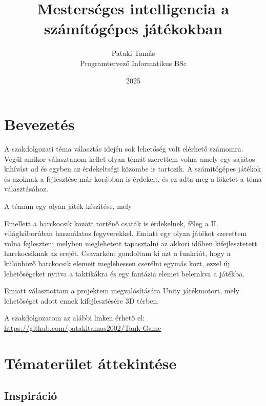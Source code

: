 \documentclass[
]{thesis-ekf}
\theoremstyle{definition}
\theoremstyle{remark}
\begin{document}
\title{Mesterséges intelligencia a számítógépes játékokban}
\author{Pataki Tamás\\Programtervező Informatikus BSc}
\date{2025}
\maketitle

\tableofcontents

\chapter*{Bevezetés}

A szakdolgozati téma választás idején sok lehetőség volt elérhető számomra. Végül amikor választanom kellet olyan témát szerettem volna amely egy sajátos kihívást ad és egyben az érdekeltségi közömbe is tartozik. A számítógépes játékok és azoknak a fejlesztése már korábban is érdekelt, és ez adta meg a löketet a téma választásához.

A témám egy olyan játék készítése, mely

Emellett a harckocsik között történő csaták is érdekelnek, főleg a II. világháborúban használatos fegyverekkel. Emiatt egy olyan játékot szerettem volna fejleszteni melyben meglehetett tapasztalni az akkori időben kifejlesztetett harckocsiknak az erejét. Csavarként gondoltam ki azt a funkciót, hogy a különböző harckocsik elemeit meglehessen cserélni egymás közt, ezzel új lehetőségeket nyitva a taktikákra és egy fantázia elemet belerakva a játékba.

Emiatt választottam a projektem megvalósítására Unity\cite{unity} játékmotort, mely lehetőséget adott ennek kifejlesztésére 3D térben.



A szakdolgozatom az alábbi linken érhető el: \url{https://github.com/patakitamas2002/Tank-Game}

\chapter{Tématerület áttekintése}

\section{Inspiráció}
\end{document}
